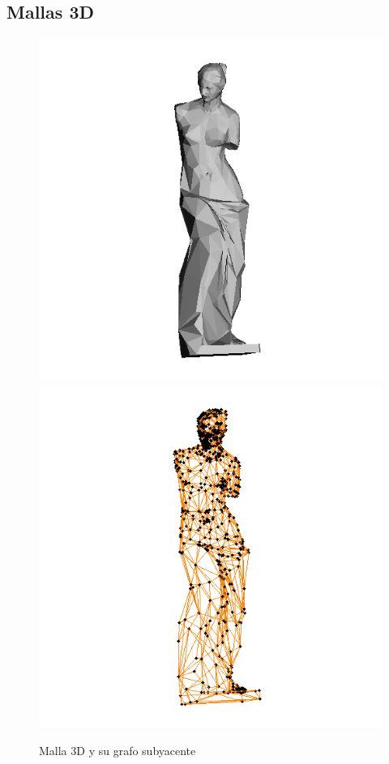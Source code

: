 \documentclass[conference,compsoc,a4paper]{IEEEtran}
\begin{document}
\subsection{Mallas 3D}

\begin{figure}
	\includegraphics[scale=.21]{venusv_solid.jpg} %
	\includegraphics[scale=.21]{venusv_graph.jpg} %
	\caption{Malla 3D y su grafo subyacente}%
	\label{fig:venus} %
\end{figure}
\end{document}
